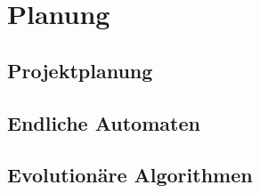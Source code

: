 \section{Planung}
\subsection{Projektplanung}
\subsection{Endliche Automaten}
\subsection{Evolutionäre Algorithmen}